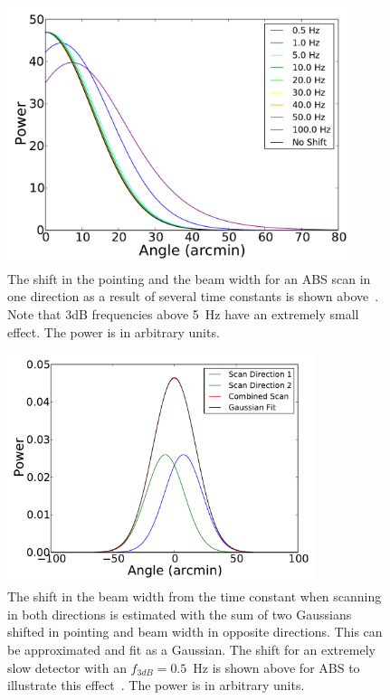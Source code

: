 \begin{figure}[h!]
\centering
\includegraphics[width=0.90\textwidth]{figures/time_constant_shift.pdf}
\caption{The shift in the pointing and the beam width for an ABS scan in one direction as a result of several time constants is shown above~\cite{Simon_Thesis_2016}. Note that 3dB frequencies above 5~Hz have an extremely small effect. The power is in arbitrary units.}
\label{fig:tc_shift}
\end{figure}


\begin{figure}[h!]
\centering
\includegraphics[width=0.80\textwidth]{figures/half_hertz_shift.pdf}
\caption{The shift in the beam width from the time constant when scanning in both directions is estimated with the sum of two Gaussians shifted in pointing and beam width in opposite directions. This can be approximated and fit as a Gaussian. The shift for an extremely slow detector with an $f_{3dB}=0.5$~Hz is shown above for ABS to illustrate this effect~\cite{Simon_Thesis_2016}. The power is in arbitrary units.}
\label{fig:tc_beam_shift}
\end{figure}

